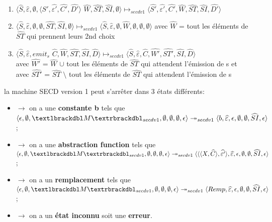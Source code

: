 \documentclass[10pt,a4paper]{article}
\begin{document}
\begin{enumerate}
					\item $\langle\widehat{S},\widehat{\varepsilon},\emptyset,\langle\widehat{S'},\widehat{\varepsilon'},\widehat{C'},\widehat{D'}\rangle$ $\widehat{W},\widehat{ST},\widehat{SI},\emptyset\rangle \longmapsto_{secdv1} \langle\widehat{S'},\widehat{\varepsilon'},\widehat{C'},\widehat{W},\widehat{ST},\widehat{SI},\widehat{D'}\rangle$
					\item  $\langle\widehat{S},\widehat{\varepsilon},\emptyset,\emptyset,\widehat{ST},\widehat{SI},\emptyset\rangle \longmapsto_{secdv1} \langle\widehat{S},\widehat{\varepsilon},\emptyset,\widehat{W},\emptyset,\emptyset,\emptyset\rangle$ avec $\widehat{W}$ = tout les éléments de $\widehat{ST}$ qui prennent leurs 2nd choix 
					\item $\langle\widehat{S},\widehat{\varepsilon},emit_{s}$ $\widehat{C},\widehat{W},\widehat{ST},\widehat{SI},\widehat{D}\rangle \longmapsto_{secdv1} \langle \widehat{S},\widehat{\varepsilon},\widehat{C},\widehat{W'},\widehat{ST'},\widehat{SI},\widehat{D}\rangle$\\ avec $\widehat{W'}$ = $\widehat{W}$ $\cup$ tout les éléments de $\widehat{ST}$ qui attendent l'émission de s et\\
					avec $\widehat{ST'}$ = $\widehat{ST}$ $\setminus$ tout les éléments de $\widehat{ST}$ qui attendent l'émission de s
				\end{enumerate}
				\bigbreak
				
				
				la machine SECD version 1 peut s'arrêter dans 3 états différents:
				\begin{itemize}
					\item[]$\longrightarrow$ on a une \textbf{constante b} tels que $\langle \epsilon,\emptyset,\textlbrackdbl M\textrbrackdbl_{secdv1},\emptyset,\emptyset,\emptyset,\epsilon\rangle \twoheadrightarrow_{secdv1} \langle b,\widehat{\varepsilon},\epsilon,\emptyset,\emptyset,\widehat{SI},\epsilon\rangle$;
					\item[]$\longrightarrow$ on a une \textbf{abstraction function} tels que $\langle \epsilon,\emptyset,\textlbrackdbl M\textrbrackdbl_{secdv1},\emptyset,\emptyset,\emptyset,\epsilon\rangle \twoheadrightarrow_{secdv1} \langle\langle\langle X,\widehat{C}\rangle,\widehat{\varepsilon'}\rangle,\widehat{\varepsilon},\epsilon,\emptyset,\emptyset,\widehat{SI},\epsilon\rangle$;
					\item[]$\longrightarrow$ on a un \textbf{remplacement} tels que $\langle \epsilon,\emptyset,\textlbrackdbl M\textrbrackdbl_{secdv1},\emptyset,\emptyset,\emptyset,\epsilon\rangle \twoheadrightarrow_{secdv1} \langle Remp,\widehat{\varepsilon},\epsilon,\emptyset,\emptyset,\widehat{SI},\epsilon\rangle$;
					\item[]$\longrightarrow$ on a un \textbf{état inconnu} soit une \textbf{erreur}.
				\end{itemize}
				\newpage
				
\end{document}
